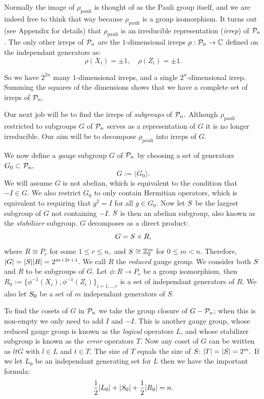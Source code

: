 \documentclass[12pt,notitlepage,longbibliography,nofootinbib,tightenlines]{revtex4}
\begin{document}
Normally the image of 
$\rho_{\mathrm{pauli}}$ is thought of as the
Pauli group itself, and we are indeed free to think
that way because $\rho_{\mathrm{pauli}}$ is a group
isomorphism.
It turns out (see Appendix for details)
that $\rho_{\mathrm{pauli}}$ is an
irreducible representation ({\it irrep}) of $\mathcal{P}_n$. 
The only other irreps of $\mathcal{P}_n$ are 
the $1$-dimensional irreps $\rho:\mathcal{P}_n\to\mathbb{C}$
defined on the independant generators as:
    $$ \rho(X_i) = \pm 1,\quad \rho(Z_i) = \pm 1.$$

So we have $2^{2n}$ many $1$-dimensional irreps,
and a single $2^n$-dimensional irrep.
Summing the squares of the dimensions
shows that we have a complete set of irreps of $\mathcal{P}_n.$

Our next job will be to find the irreps of {\it subgroups} of $\mathcal{P}_n.$
Although $\rho_{\mathrm{pauli}}$
restricted to subgroups $G$ of $\mathcal{P}_n$ serves as a representation
of $G$ it is no longer irreducible.
Our aim will be to decompose $\rho_{\mathrm{pauli}}$ into irreps
of $G.$

We now define a {\it gauge} subgroup $G$ of $\mathcal{P}_n$
by choosing a set of generators $G_0\subset \mathcal{P}_n,$
$$ G := \langle G_0\rangle.$$
We will assume $G$ is not abelian, which is
equivalent to the condition that $-I\in G.$
We also restrict $G_0$ to only contain Hermitian operators,
which is equivalent to requiring that $g^2=I$ for all $g\in G_0.$
Now let $S$ be the largest subgroup of $G$ not containing
$-I.$
$S$ is then an abelian subgroup,
also known as the {\it stabilizer} subgroup.
$G$ decomposes as a direct product:
$$G = S\times R,$$
where $R\cong P_r$ for some $1\le r\le n,$
and $S\cong \mathbb{Z}_2^{m}$ for $0\le m<n.$
Therefore, $|G| = |S| |R| = 2^{m+2r+1}.$
We call $R$ the {\it reduced} gauge group.
We consider both $S$ and $R$ to be subgroups of $G.$
Let $\phi:R\to P_r$ be a group isomorphism,
then $R_0 := \{\phi^{-1}(X_i), \phi^{-1}(Z_i)\}_{i=1,..,r}$
is a set of independant generators of $R.$
We also let $S_0$ be a set of $m$ independant generators of $S.$

To find the cosets of $G$ in $\mathcal{P}_n$ we take
the group closure of $G-\mathcal{P}_n$; when this is non-empty
we only need to add $I$ and $-I.$
This is another
gauge group, whose reduced gauge group is known as
the {\it logical} operators $L$, and whose 
stabilizer subgroup is known as the {\it error} operators $T.$
Now any coset of $G$ can be written as $ltG$ with
$l\in L$ and $t\in T.$
The size of $T$ equals the size of $S$: $|T|=|S|=2^m.$
If we let $L_0$ be an independant generating set for $L$
then we have the important formula:
\begin{equation}\label{formula}
\frac{1}{2}|L_0| + |S_0| + \frac{1}{2}|R_0| = n.
\end{equation}
\end{document}
